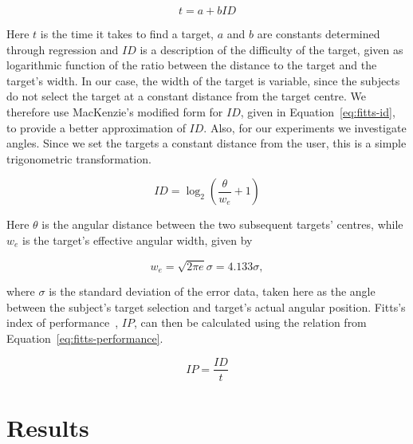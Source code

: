 \documentclass[format=sigconf, review=true, screen=true, anonymous=true]{acmart}
\begin{document}
\begin{equation}
  \label{eq:fitts-base}
  t = a + bID%
\end{equation}


Here $t$ is the time it takes to find a target, $a$ and $b$ are constants determined through regression and $ID$ is a description of the difficulty of the target, given as logarithmic function of the ratio between the distance to the target and the target's width. In our case, the width of the target is variable, since the subjects do not select the target at a constant distance from the target centre. We therefore use MacKenzie's modified form for $ID$, given in Equation~\ref{eq:fitts-id}, to provide a better approximation of $ID$. Also, for our experiments we investigate angles. Since we set the targets a constant distance from the user, this is a simple trigonometric transformation.

\begin{equation}
  \label{eq:fitts-id}
  ID = \log_2\left(\frac{\theta}{w_e} + 1\right)
\end{equation}

Here $\theta$ is the angular distance between the two subsequent targets' centres, while $w_e$ is the target's effective angular width, given by

\begin{equation}
  w_e = \sqrt{2\pi e}\sigma = 4.133\sigma,
\end{equation}

\noindent
where $\sigma$ is the standard deviation of the error data, taken here as the angle between the subject's target selection and target's actual angular position. Fitts's index of performance~\cite[p.~390]{fitts1954information}, $IP$, can then be calculated using the relation from Equation~\ref{eq:fitts-performance}. 

\begin{equation}
  \label{eq:fitts-performance}
  IP = \frac{ID}{t}
\end{equation}

\section{Results}
\label{sec:results}
\end{document}
